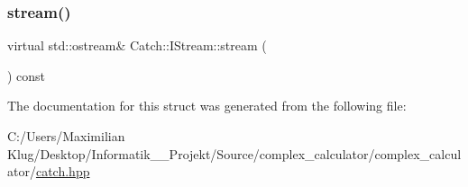 \subsubsection{\texorpdfstring{stream()}{stream()}}
{\footnotesize\ttfamily virtual std\+::ostream\& Catch\+::\+I\+Stream\+::stream (\begin{DoxyParamCaption}{ }\end{DoxyParamCaption}) const\hspace{0.3cm}{\ttfamily [pure virtual]}}



The documentation for this struct was generated from the following file\+:\begin{DoxyCompactItemize}
\item 
C\+:/\+Users/\+Maximilian Klug/\+Desktop/\+Informatik\+\_\+\_\+\+Projekt/\+Source/complex\+\_\+calculator/complex\+\_\+calculator/\mbox{\hyperlink{catch_8hpp}{catch.\+hpp}}\end{DoxyCompactItemize}
